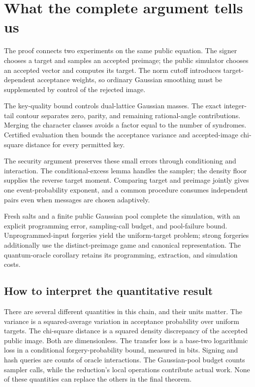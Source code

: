 \documentclass[11pt,a4paper]{article}
\theoremstyle{definition}
\theoremstyle{remark}
\numberwithin{equation}{section}
\begin{document}
\section{What the complete argument tells us}

The proof connects two experiments on the same public equation. The signer chooses a target and samples an accepted preimage; the public simulator chooses an accepted vector and computes its target. The norm cutoff introduces target-dependent acceptance weights, so ordinary Gaussian smoothing must be supplemented by control of the rejected image.

The key-quality bound controls dual-lattice Gaussian masses. The exact integer-tail contour separates zero, parity, and remaining rational-angle contributions. Merging the character classes avoids a factor equal to the number of syndromes. Certified evaluation then bounds the acceptance variance and accepted-image chi-square distance for every permitted key.

The security argument preserves these small errors through conditioning and interaction. The conditional-excess lemma handles the sampler; the density floor supplies the reverse target moment. Comparing target and preimage jointly gives one event-probability exponent, and a common procedure consumes independent pairs even when messages are chosen adaptively.

Fresh salts and a finite public Gaussian pool complete the simulation, with an explicit programming error, sampling-call budget, and pool-failure bound. Unprogrammed-input forgeries yield the uniform-target problem; strong forgeries additionally use the distinct-preimage game and canonical representation. The quantum-oracle corollary retains its programming, extraction, and simulation costs.

\subsection{How to interpret the quantitative result}

There are several different quantities in this chain, and their units matter. The variance is a squared-average variation in acceptance probability over uniform targets. The chi-square distance is a squared density discrepancy of the accepted public image. Both are dimensionless. The transfer loss is a base-two logarithmic loss in a conditional forgery-probability bound, measured in bits. Signing and hash queries are counts of oracle interactions. The Gaussian-pool budget counts sampler calls, while the reduction's local operations contribute actual work. None of these quantities can replace the others in the final theorem.
\end{document}
